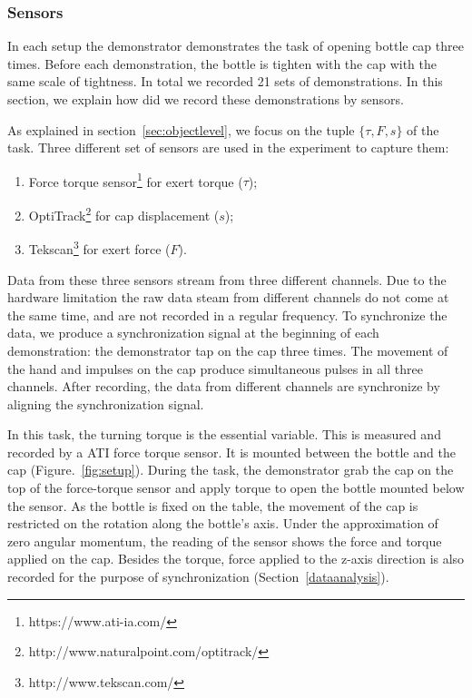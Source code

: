 \subsubsection{Sensors}
\label{sec:sensor}
In each setup the demonstrator demonstrates the task of opening bottle cap three times. Before each demonstration, the bottle is tighten with the cap with the same scale of tightness. In total we recorded 21 sets of demonstrations. In this section, we explain how did we record these demonstrations by sensors.



As explained in section~\ref{sec:objectlevel}, we focus on the tuple $\{\tau,F,s\}$ of the task. Three different set of sensors are used in the experiment to capture them:

\begin{enumerate}
\item Force torque sensor\footnote{https://www.ati-ia.com/} for exert torque ($\tau$);
\item OptiTrack\footnote{http://www.naturalpoint.com/optitrack/} for cap displacement ($s$);
\item Tekscan\footnote{http://www.tekscan.com/} for exert force ($F$).
\end{enumerate}

Data from these three sensors stream from three different channels. Due to the hardware limitation the raw data steam from different channels do not come at the same time, and are not recorded in a regular frequency. To synchronize the data, we produce a synchronization signal at the beginning of each demonstration: the demonstrator tap on the cap three times. The movement of the hand and impulses on the cap produce simultaneous pulses in all three channels. After recording, the data from different channels are synchronize by aligning the synchronization signal.

In this task, the turning torque is the essential variable. This is measured and recorded by a ATI force torque sensor. It is mounted between the bottle and the cap (Figure.~\ref{fig:setup}). During the task, the demonstrator grab the cap on the top of the force-torque sensor and apply torque to open the bottle mounted below the sensor. As the bottle is fixed on the table, the movement of the cap is restricted on the rotation along the bottle's axis. Under the approximation of zero angular momentum, the reading of the sensor shows the force and torque applied on the cap. Besides the torque, force applied to the z-axis direction is also recorded for the purpose of synchronization (Section~\ref{dataanalysis}).

